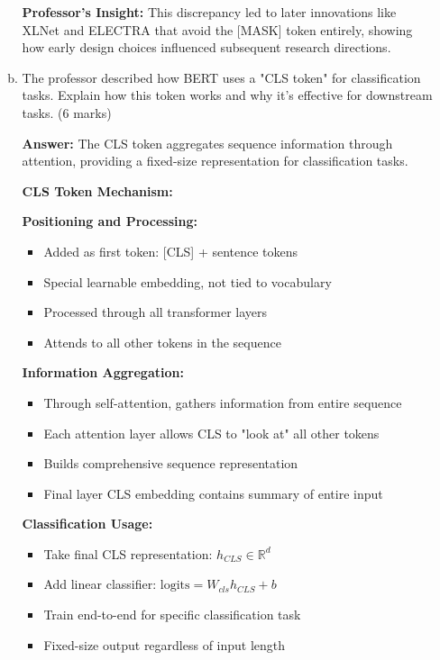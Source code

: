 \documentclass[12pt]{article}
\newcommand{\answer}[1]{{\color{answercolor}\textbf{Answer:} #1}}
\newcommand{\explanation}[1]{{\color{explanationcolor}#1}}
\begin{document}
\begin{enumerate}
\begin{enumerate}[(a)]
{    \textbf{Professor's Insight:}
    This discrepancy led to later innovations like XLNet and ELECTRA that avoid the [MASK] token entirely, showing how early design choices influenced subsequent research directions.
    }
    
    \item The professor described how BERT uses a "CLS token" for classification tasks. Explain how this token works and why it's effective for downstream tasks. \hfill (6 marks)
    
    \answer{The CLS token aggregates sequence information through attention, providing a fixed-size representation for classification tasks.}
    
    \explanation{
    \textbf{CLS Token Mechanism:}
    
    \textbf{Positioning and Processing:}
    \begin{itemize}
        \item Added as first token: [CLS] + sentence tokens
        \item Special learnable embedding, not tied to vocabulary
        \item Processed through all transformer layers
        \item Attends to all other tokens in the sequence
    \end{itemize}
    
    \textbf{Information Aggregation:}
    \begin{itemize}
        \item Through self-attention, gathers information from entire sequence
        \item Each attention layer allows CLS to "look at" all other tokens
        \item Builds comprehensive sequence representation
        \item Final layer CLS embedding contains summary of entire input
    \end{itemize}
    
    \textbf{Classification Usage:}
    \begin{itemize}
        \item Take final CLS representation: $h_{CLS} \in \mathbb{R}^d$
        \item Add linear classifier: $\text{logits} = W_{cls} h_{CLS} + b$
        \item Train end-to-end for specific classification task
        \item Fixed-size output regardless of input length
    \end{itemize}
    
}
\end{enumerate}
\end{enumerate}
\end{document}
